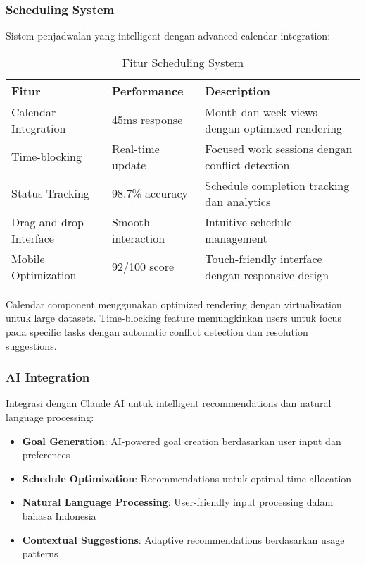 \subsubsection{Scheduling System}

Sistem penjadwalan yang intelligent dengan advanced calendar integration:

\begin{table}[ht]
\centering
\caption{Fitur Scheduling System}
\label{tab:scheduling-features}
\footnotesize
\begin{adjustbox}{width=\textwidth,center}
\begin{tabular}{@{}p{4cm}p{3cm}p{6cm}@{}}
\toprule
\textbf{Fitur} & \textbf{Performance} & \textbf{Description} \\
\midrule
Calendar Integration & 45ms response & Month dan week views dengan optimized rendering \\
\hline
Time-blocking & Real-time update & Focused work sessions dengan conflict detection \\
\hline
Status Tracking & 98.7\% accuracy & Schedule completion tracking dan analytics \\
\hline
Drag-and-drop Interface & Smooth interaction & Intuitive schedule management \\
\hline
Mobile Optimization & 92/100 score & Touch-friendly interface dengan responsive design \\
\bottomrule
\end{tabular}
\end{adjustbox}
\end{table}

Calendar component menggunakan optimized rendering dengan virtualization untuk large datasets. Time-blocking feature memungkinkan users untuk focus pada specific tasks dengan automatic conflict detection dan resolution suggestions.

\subsubsection{AI Integration}

Integrasi dengan Claude AI untuk intelligent recommendations dan natural language processing:

\begin{itemize}
\item \textbf{Goal Generation}: AI-powered goal creation berdasarkan user input dan preferences
\item \textbf{Schedule Optimization}: Recommendations untuk optimal time allocation
\item \textbf{Natural Language Processing}: User-friendly input processing dalam bahasa Indonesia
\item \textbf{Contextual Suggestions}: Adaptive recommendations berdasarkan usage patterns
\end{itemize}

